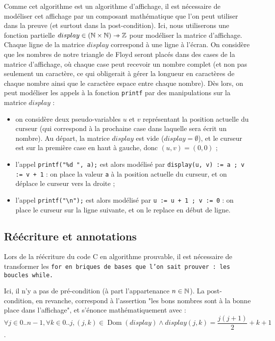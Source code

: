 \documentclass[a4paper, 11pt]{article}
\newcommand{\pto}{\mathrel{\ooalign{\hfil$\mapstochar$\hfil\cr$\to$\cr}}}
\DeclareMathOperator{\ddom}{Dom}
\newcommand{\dom}[1]{\ddom\left(#1\right)}
\theoremstyle{mystyle}
\begin{document}
Comme cet algorithme est un algorithme d'affichage, il est nécessaire de modéliser cet affichage par un composant mathématique que l'on peut utiliser dans la preuve (et surtout dans la post-condition). Ici, nous utiliserons une fonction partielle $display \in (\N \times \N) \pto \Z$ pour modéliser la matrice d'affichage. Chaque ligne de la matrice $display$ correspond à une ligne à l'écran. On considère que les nombres de notre triangle de Floyd seront placés dans des cases de la matrice d'affichage, où chaque case peut recevoir un nombre complet (et non pas seulement un caractère, ce qui obligerait à gérer la longueur en caractères de chaque nombre ainsi que le caractère espace entre chaque nombre). Dès lors, on peut modéliser les appels à la fonction \texttt{printf} par des manipulations sur la matrice $display$ :
\begin{itemize}
    \item on considère deux pseudo-variables $u$ et $v$ représentant la position actuelle du curseur (qui correspond à la prochaine case dans laquelle sera écrit un nombre). Au départ, la matrice $display$ est vide ($display = \emptyset$), et le curseur est sur la première case en haut à gauche, donc $(u, v) = (0, 0)$ ;
    \item l'appel \texttt{printf("\%d ", a);} est alors modélisé par \texttt{display(u, v) := a ; v := v + 1} : on place la valeur \texttt{a} à la position actuelle du curseur, et on déplace le curseur vers la droite ;
    \item l'appel \texttt{printf("\textbackslash{}n");} est alors modélisé par \texttt{u := u + 1 ; v := 0} : on place le curseur sur la ligne suivante, et on le replace en début de ligne.
\end{itemize}

\subsection{Réécriture et annotations}

Lors de la réécriture du code C en algorithme prouvable, il est nécessaire de transformer les \tt{for} en briques de bases que l'on sait prouver : les boucles \tt{while}.

Ici, il n'y a pas de pré-condition (à part l'appartenance $n \in \mathbb{N}$). La post-condition, en revanche, correspond à l'assertion "les bons nombres sont à la bonne place dans l'affichage", et s'énonce mathématiquement avec : $\forall j \in 0..n-1, \forall k \in 0..j, (j, k) \in \dom{display} \land display(j, k) = \dfrac{j(j+1)}{2} + k + 1$.
\end{document}
